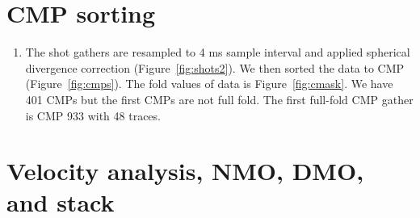 \section{CMP sorting}

\begin{enumerate}

\item The shot gathers are resampled to 4 ms sample interval and applied spherical divergence correction (Figure~\ref{fig:shots2}). We then sorted the data to CMP (Figure~\ref{fig:cmps}). The fold values of data is Figure~\ref{fig:cmask}. We have 401 CMPs but the first CMPs are not full fold. The first full-fold CMP gather is CMP 933 with 48 traces.

 
\end{enumerate}\clearpage

\section{Velocity analysis, NMO, DMO, and stack}

